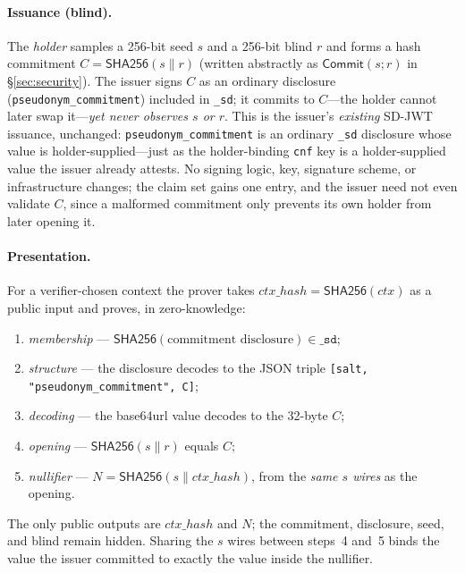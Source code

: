 \documentclass[11pt]{article}
\theoremstyle{plain}
\theoremstyle{definition}
\begin{document}
\paragraph{Issuance (blind).} The \emph{holder} samples a 256-bit seed $s$ and a
256-bit blind $r$ and forms a hash commitment $C=\mathsf{SHA256}(s\|r)$ (written
abstractly as $\mathsf{Commit}(s;r)$ in \S\ref{sec:security}). The issuer
signs $C$ as an ordinary disclosure (\texttt{pseudonym\_commitment}) included in
\texttt{\_sd}; it commits to $C$---the holder cannot later swap it---\emph{yet never
observes $s$ or $r$}. This is the issuer's \emph{existing} SD-JWT issuance, unchanged:
\texttt{pseudonym\_commitment} is an ordinary \texttt{\_sd} disclosure whose value is
holder-supplied---just as the holder-binding \texttt{cnf} key is a holder-supplied
value the issuer already attests. No signing logic, key, signature scheme, or
infrastructure changes; the claim set gains one entry, and the issuer need not even
validate $C$, since a malformed commitment only prevents its own holder from later
opening it.

\paragraph{Presentation.} For a verifier-chosen context the prover takes
$\mathit{ctx\_hash}=\mathsf{SHA256}(\mathit{ctx})$ as a public input and proves, in
zero-knowledge:
\begin{enumerate}
\item \emph{membership} --- $\mathsf{SHA256}(\text{commitment disclosure})\in\texttt{\_sd}$;
\item \emph{structure} --- the disclosure decodes to the JSON triple \texttt{[salt, "pseudonym\_commitment", C]};
\item \emph{decoding} --- the base64url value decodes to the 32-byte $C$;
\item \emph{opening} --- $\mathsf{SHA256}(s\|r)$ equals $C$;
\item \emph{nullifier} --- $N=\mathsf{SHA256}(s\|\mathit{ctx\_hash})$, from the \emph{same $s$ wires} as the opening.
\end{enumerate}
The only public outputs are $\mathit{ctx\_hash}$ and $N$; the commitment, disclosure,
seed, and blind remain hidden. Sharing the $s$ wires between steps~4 and~5 binds the
value the issuer committed to exactly the value inside the nullifier.
\end{document}
